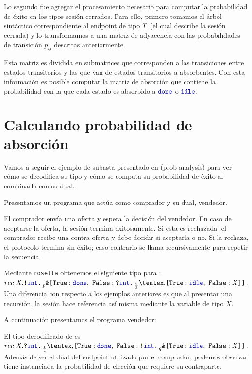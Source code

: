 Lo segundo fue agregar el procesamiento necesario para computar la probabilidad
de éxito en los tipos sesión cerrados. Para ello, primero tomamos el árbol
sintáctico correspondiente al endpoint de tipo $T$ (el cual describe
la sesión cerrada) y lo transformamos a una matriz de adyacencia con las
probabilidades de transición $p_{ij}$ descritas anteriormente.

Esta matriz es dividida en submatrices que corresponden a las transiciones
entre estados transitorios y las que van de estados transitorios a absorbentes.
Con esta información es posible computar la matriz de absorción que contiene la
probabilidad con la que cada estado es absorbido a $\Done$ o $\Idle$.

\section{Calculando probabilidad de absorción}

Vamos a seguir el ejemplo de subasta presentado en (prob analysis)  para ver cómo se decodifica su tipo y cómo se computa su
probabilidad de éxito al combinarlo con su dual.

Presentamos un programa que actúa como comprador y su dual, vendedor.

\AuctionBuyer

El comprador envía una oferta y espera la decisión del vendedor. En caso de
aceptarse la oferta, la sesión termina exitosamente. Si esta es rechazada; el
comprador recibe una contra-oferta y debe decidir si aceptarla o no. Si la
rechaza, el protocolo termina sin éxito; caso contrario se llama recursivamente
para repetir la secuencia.

Mediante \texttt{rosetta} obtenemos el siguiente tipo para : $rec\
X.\Out\tint\BinaryPBranch[p]{\Done}{\In\tint\BinaryPChoice[\frac{2}{3}]{\Idle}{X}}$.
Una diferencia con respecto a los ejemplos anteriores es que al presentar una
recursión, la sesión hace referencia así misma mediante la variable de tipo $X$.

A continuación presentamos el programa vendedor:

\AuctionSeller

El tipo decodificado de  es $rec\
X.\In\tint\BinaryPChoice[\frac{1}{4}]{\Done}{\Out\tint\BinaryPBranch[q]{\Idle}{X}}$.
Además de ser el dual del endpoint utilizado por el comprador, podemos observar
tiene instanciada la probabilidad de elección que requiere su contraparte.

